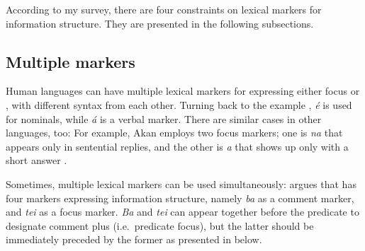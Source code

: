 According to my survey, there are four constraints on lexical markers
for information structure. They are presented in the following
subsections.



\subsection{Multiple markers}
\label{4:ssec:multiple}

Human languages can have multiple lexical markers for expressing
either focus or , with different syntax from each other. Turning
back to the  example , \textit{{\'e}} is
used for nominals, while \textit{{\'a}} is a verbal 
marker. There are similar cases in other languages, too: For example,
Akan employs two focus markers; one is \textit{na} that appears only
in sentential replies, and the other is \textit{a} that shows up only
with a short answer \citep[4]{drubig:03}.





Sometimes, multiple lexical markers can be used
simultaneously: \citet{schneider:09} argues that
 has four markers expressing information structure, namely
 \textit{ba} as a comment marker, and \textit{tei} as a focus
marker.  \textit{Ba} and \textit{tei} can appear together before the
predicate to designate comment plus  (i.e.\ predicate focus), but
the latter should be immediately preceded by the former as presented
in  below.






